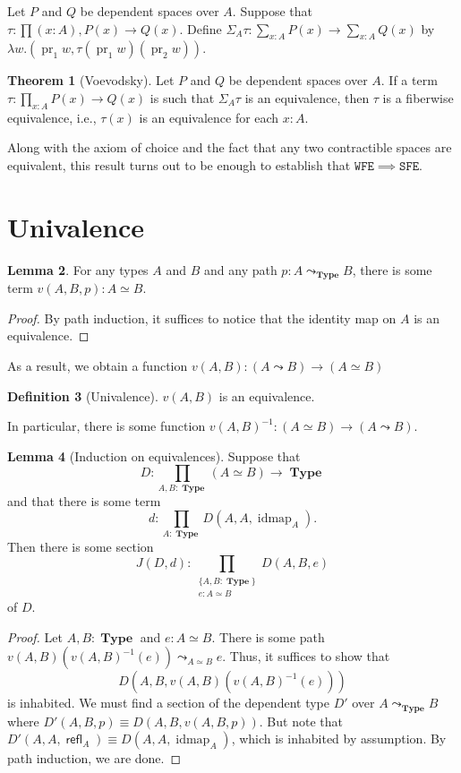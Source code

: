 \documentclass[10pt,letterpaper,cm]{nupset}
\theoremstyle{definition}
\newtheorem{definition}{Definition}[subsection]
\theoremstyle{theorem}
\newtheorem{theorem}[definition]{Theorem}
\newtheorem{lemma}[definition]{Lemma}
\theoremstyle{remark}
\newcommand{\1}{\mathbf{1}}
\newcommand{\wfe}{\mathtt{WFE}}
\newcommand{\sfe}{\mathtt{SFE}}
\newcommand{\0}{\vec 0}
\DeclareMathOperator{\idmap}{idmap}
\DeclareMathOperator{\refl}{\mathsf{refl}}
\DeclareMathOperator{\pr}{pr}
\DeclareMathOperator{\type}{\mathbf{Type}}
\begin{document}
\smallskip

Let $P$ and $Q$ be dependent spaces over $A$. Suppose that $\tau : \prod(x:A), P(x) \to Q(x)$. Define $\Sigma_A\tau : \sum_{x:A}P(x) \to \sum_{x:A} Q(x)$ by $\lambda w. (\pr_1 w, \tau(\pr_1w)(\pr_2w))$.


\begin{theorem}[Voevodsky]
Let $P$ and $Q$ be dependent spaces over $A$. If a term $\tau : \prod_{x:A} P(x) \to Q(x)$ is such that $\Sigma_A \tau$ is an equivalence, then $\tau$ is a fiberwise equivalence, i.e., $\tau(x)$ is an equivalence for each $x:A$. 
\end{theorem}

Along with the axiom of choice and the fact that any two contractible spaces are equivalent, this result turns out to be enough to establish that $\wfe \implies \sfe$.


\section{Univalence}

\begin{lemma}
For any types $A$ and $B$ and any path $p: A \leadsto_{\type} B$, there is some term $v(A, B, p) : A \simeq B$.  
\end{lemma}
\begin{proof}
By path induction, it suffices to notice that the identity map on $A$ is an equivalence.
\end{proof}

As a result, we obtain a function $v(A, B) : \left(A \leadsto B\right) \to \left(A \simeq B\right)$

\begin{definition}[Univalence]
 $v(A, B)$ is an equivalence. 
\end{definition}

In particular, there is some function $v(A, B) ^{{-}1}: \left(A \simeq B\right) \to \left(A \leadsto B\right)$.

\smallskip

\begin{lemma}[Induction on equivalences] 
Suppose that $$D: \prod_{A, B : \type}\left(A \simeq B\right) \to \type$$ and that there is some term $$d: \prod_{A: \type}D(A, A, \idmap_A).$$ Then there is some section  $$J(D, d)  :  \prod_{\substack{\{A,B:\type\} \\ e:A\simeq B}} D(A,B,e) $$ of $D$. 
\end{lemma}
\begin{proof}
Let $A,B: \type$ and $e: A \simeq B$. There is some path $v(A,B)(v(A,B)^{{-}1}(e))\leadsto_{A\simeq B} e$. Thus, it suffices to show that $$D(A, B, v(A,B)(v(A,B)^{{-}1}(e)))$$ is inhabited. We must  find a section of the dependent type $D'$ over $A\leadsto_{\type} B$ where $D'(A, B, p) \equiv D(A, B, v(A, B, p))$. But note that $D'(A, A, \refl_A) \equiv D(A, A, \idmap_A)$, which is inhabited by assumption. By path induction, we are done.
\end{proof}
\end{document}
